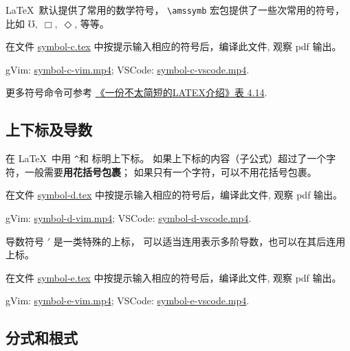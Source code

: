 \documentclass[
    11pt,
    base=hide,
    cite=authoryear,
    device=phone,
    lang=cn,
    mode=simple,
    result=answer,
    toc=onecol,
]{elegantsierxue310}
\begin{document}
\LaTeX\ 默认提供了常用的数学符号，
\lstinline{\amssymb} 宏包提供了一些次常用的符号，比如
\(\mho,\;\Box,\;\Diamond\), 等等。
\begin{exercise}\label{ex:symbol-c}
    在文件
    \href{learn-latex/basic-03/symbol-c.tex}{symbol-c.tex}
    中按提示输入相应的符号后，编译此文件, 观察 pdf 输出。
\end{exercise}
\begin{cast}\label{cast:symbol-c}
    gVim: \href{media/casts/symbol-c-vim.mp4}{symbol-c-vim.mp4};
    VSCode: \href{media/casts/symbol-c-vscode.mp4}{symbol-c-vscode.mp4}.
\end{cast}
更多符号命令可参考
\hyperlink{books/lshort-zh-cn.pdf.69}%
{《一份不太简短的LATEX介绍》表 4.14}.


\subsection{上下标及导数}%
\label{sub:sup_sub_scripts}

在 \LaTeX\ 中用 \texttt\textasciicircum 和 \texttt\textunderscore 标明上下标。
如果上下标的内容（子公式）超过了一个字符，一般需要\textbf{用花括号包裹}；
如果只有一个字符，可以不用花括号包裹。

\begin{exercise}\label{ex:symbol-d}
    在文件
    \href{learn-latex/basic-03/symbol-d.tex}{symbol-d.tex}
    中按提示输入相应的符号后，编译此文件, 观察 pdf 输出。
\end{exercise}
\begin{cast}\label{cast:symbol-d}
    gVim: \href{media/casts/symbol-d-vim.mp4}{symbol-d-vim.mp4};
    VSCode: \href{media/casts/symbol-d-vscode.mp4}{symbol-d-vscode.mp4}.
\end{cast}

导数符号 ${}'$ 是一类特殊的上标，
可以适当连用表示多阶导数，也可以在其后连用上标。

\begin{exercise}\label{ex:symbol-e}
    在文件
    \href{learn-latex/basic-03/symbol-e.tex}{symbol-e.tex}
    中按提示输入相应的符号后，编译此文件, 观察 pdf 输出。
\end{exercise}
\begin{cast}\label{cast:symbol-e}
    gVim: \href{media/casts/symbol-e-vim.mp4}{symbol-e-vim.mp4};
    VSCode: \href{media/casts/symbol-e-vscode.mp4}{symbol-e-vscode.mp4}.
\end{cast}

\subsection{分式和根式}%
\label{sub:frac-sqrt}
\end{document}
